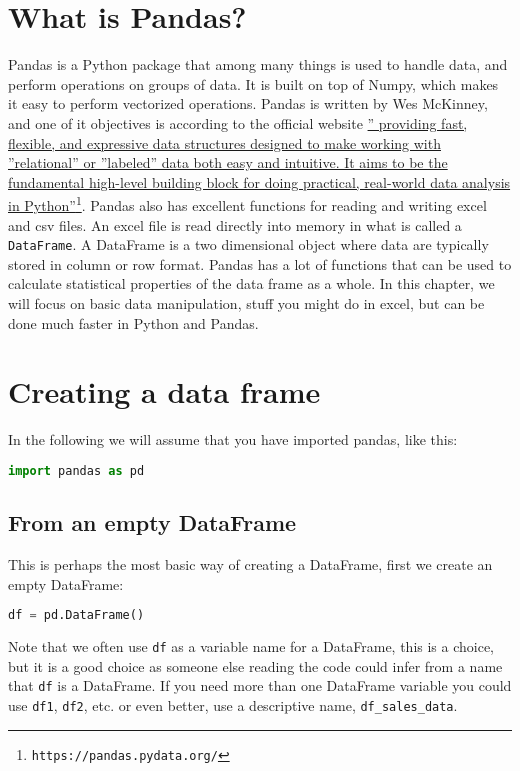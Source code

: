 \documentclass[graybox,sectrefs,envcountresetchap,open=right,final]{svmonodo}
\newenvironment{graybox2admon}[1][]{
\begin{graybox2mdframed}[frametitle=#1]
}
{
\end{graybox2mdframed}
}
\begin{document}
\section{What is Pandas?}
Pandas is a Python package that among many things is used to handle data, and perform operations on groups of data. It is built on top of Numpy, which makes it easy to perform vectorized operations. Pandas is written by Wes McKinney, and one of it objectives is according to the official website \href{{https://pandas.pydata.org/}}{'' providing fast, flexible, and expressive data structures designed to make working with ''relational'' or ''labeled'' data both easy and intuitive. It aims to be the fundamental high-level building block for doing practical, real-world data analysis in Python''}\footnote{\texttt{https://pandas.pydata.org/}}. Pandas also has excellent functions for reading and writing excel and csv files.  An excel file is read directly into memory in what is called a \texttt{DataFrame}. A DataFrame is a two dimensional object where data are typically stored in column or row format. Pandas has a lot of functions that can be used to calculate statistical properties of the data frame as a whole. In this chapter, we will focus on basic data manipulation, stuff you might do in excel, but can be done much faster in Python and Pandas.

\section{Creating a data frame}
In the following we will assume that you have imported pandas, like this:


\begin{lstlisting}[language=python,style=blue1bar]
import pandas as pd

\end{lstlisting}


\subsection{From an empty DataFrame}
This is perhaps the most basic way of creating a DataFrame, first we create an empty DataFrame:


\begin{lstlisting}[language=python,style=blue1bar]
df = pd.DataFrame()

\end{lstlisting}



\begin{graybox2admon}[Variable name]
Note that we often use \texttt{df} as a variable name for a DataFrame, this is a choice, but it is a good choice as someone else reading the code could infer from a name that \texttt{df} is a DataFrame. If you need more than one DataFrame variable you could use \texttt{df1}, \texttt{df2}, etc. or even better, use a descriptive name, \Verb!df_sales_data!.
\end{graybox2admon}
\end{document}
